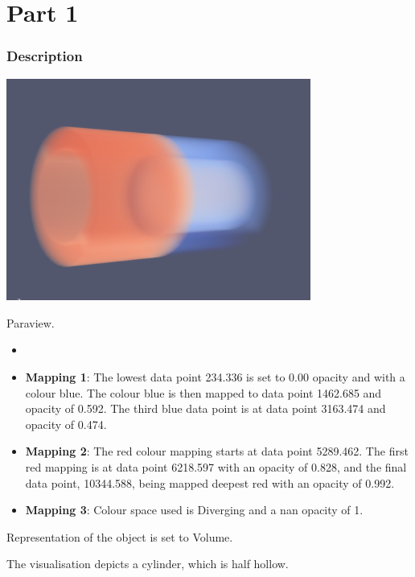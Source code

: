 \hypertarget{part-1-design-1}{%
	\section{Part 1}\label{part-1-design-1}}

\centering


\hypertarget{description}{%
	\subsubsection{Description}\label{description}}

\begin{description}
	\item[Image:]
	\item\includegraphics[width=10cm]{Task1.png}
	\item[Tool:]
	\hfill \break
		Paraview.
	\item[Visual Mappings:]
	\begin{itemize}
		\tightlist
		\item[ ]
	\end{itemize}
	\begin{itemize}
		\tightlist
		\item
		\textbf{Mapping 1}: 
		\hfill \break
			The lowest data point 234.336 is set to 0.00 opacity and with a colour blue. The colour blue is then mapped to data point 1462.685 and opacity of 0.592. The third blue data point is at data point 3163.474 and opacity of 0.474.
	\end{itemize}
	
	\begin{itemize}
		\tightlist
		\item
		\textbf{Mapping 2}: 
		\hfill \break
			The red colour mapping starts at data point 5289.462. The first red mapping is at data point 6218.597 with an opacity of 0.828, and the final data point, 10344.588, being mapped deepest red with an opacity of 0.992.
	\end{itemize}
	\begin{itemize}
		\tightlist
		\item
		\textbf{Mapping 3}:
		\hfill \break 
			Colour space used is Diverging and a nan opacity of 1. 
	\end{itemize}
	\item[Data Conversion:] 
	\hfill \break
		Representation of the object is set to Volume. 
	\item[Unique Observation:]
	\hfill \break 
		The visualisation depicts a cylinder, which is half hollow.
	
\end{description}
